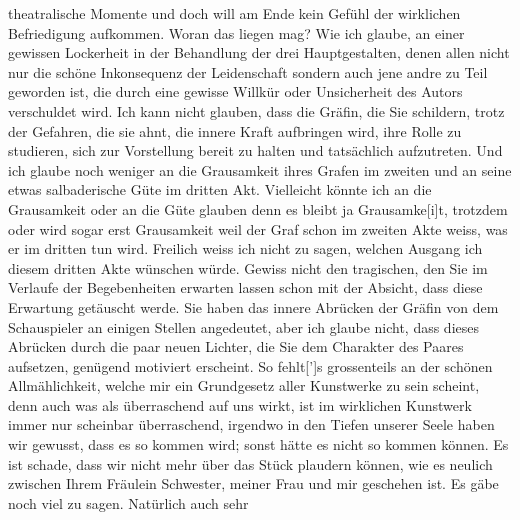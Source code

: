 \begin{ledgroupsized}[t]{13cm}
               theatralische Momente und doch will am Ende kein Gefühl der wirklichen Befriedigung
               aufkommen. Woran das liegen mag? Wie ich glaube, an einer gewissen Lockerheit in der
               Behandlung der drei Hauptgestalten, denen allen nicht nur die schöne Inkonsequenz der
               Leidenschaft sondern auch jene andre zu Teil geworden ist, die durch eine gewisse
               Willkür oder Unsicherheit des Autors verschuldet wird. Ich kann nicht glauben, dass
               die Gräfin, die Sie schildern, trotz der Gefahren, die sie ahnt, die innere Kraft
               aufbringen wird, ihre Rolle zu studieren, sich zur Vorstellung bereit zu halten und
               tatsächlich aufzutreten. Und ich glaube noch weniger an die Grausamkeit ihres Grafen
               im zweiten und an seine etwas salbaderische Güte im dritten Akt. Vielleicht könnte
               ich an die Grausamkeit oder an {\pb}die Güte glauben  denn es bleibt ja Grausamke{[}i{]}t,
               trotzdem oder wird sogar erst Grausamkeit weil der Graf schon im zweiten Akte weiss,
               was er im dritten tun wird. Freilich weiss ich nicht zu sagen, welchen Ausgang ich
               diesem dritten Akte wünschen würde. Gewiss nicht den tragischen, den Sie im Verlaufe
               der Begebenheiten erwarten lassen schon mit der Absicht, dass diese Erwartung
               getäuscht werde. Sie haben das innere Abrücken der Gräfin von dem Schauspieler an
               einigen Stellen angedeutet, aber ich glaube nicht, dass dieses Abrücken durch die
               paar neuen Lichter, die Sie dem Charakter des Paares aufsetzen, genügend motiviert
               erscheint. So fehlt{[}’{]}s grossenteils an der schönen
               Allmählichkeit, welche mir ein Grundgesetz aller Kunstwerke zu sein scheint, denn
               auch was als überraschend auf uns wirkt, ist im wirklichen Kunstwerk immer nur
               scheinbar überraschend, irgendwo in den Tiefen unserer Seele haben wir gewusst, dass
               es so kommen wird; sonst hätte es nicht so kommen können.\pend
           \pstart
           {\pb}Es ist schade, dass wir nicht mehr über das Stück plaudern können, wie es
               neulich zwischen Ihrem Fräulein Schwester, meiner Frau und mir geschehen ist. Es gäbe noch viel zu sagen. Natürlich auch sehr

\end{ledgroupsized}

